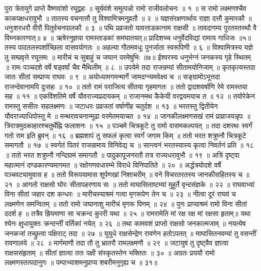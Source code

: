 पुरा त्रेतायुगे प्राप्ते वैष्णवांशो रघूद्वहः ॥
सूर्यवंशे समुत्पन्नो रामो राजीवलोचनः ॥ १ ॥
स रामो लक्ष्मणश्चैव काकपक्षधरावुभौ ॥
तातस्य वचनात्तौ तु विश्वामित्रमनुव्रतौ ॥ २ ॥
यज्ञसंरक्षणार्थाय राज्ञा दत्तौ कुमारकौ ॥
धनुःशरधरौ वीरौ पितुर्वचनपालकौ ॥ ३ ॥
पथि प्रव्रजतो यावत्ताडकानाम राक्षसी ॥
तावदागम्य पुरतस्तस्थौ वै विघ्नकारणात्॥ ४ ॥
ऋषेरनुज्ञया रामस्ताडकां समघातयत्॥
प्रादिशच्च धनुर्वेदविद्यां रामाय गाधिजः ॥५॥
तस्य पादतलस्पर्शाच्छिला वासवयोगतः ॥
अहल्या गौतमवधूः पुनर्जाता स्वरूपिणी ॥ ६ ॥
विश्वामित्रस्य यज्ञे तु सम्प्रवृत्ते रघूत्तमः ॥
मारीचं च सुबाहुं च जघान परमेषुभिः ॥७॥
ईश्वरस्य धनुर्भग्नं जनकस्य गृहे स्थितम् ॥
रामः पञ्चदशे वर्षे षड्वर्षां चैव मैथिलीम् ॥ ८ ॥
उपयेमे तदा राजन्रम्यां सीतामयोनिजाम् ॥
कृतकृत्यस्तदा जातः सीतां सम्प्राप्य राघवः ॥ ९ ॥
अयोध्यामगमन्मार्गे जामदग्न्यमवेक्ष्य च ॥
सङ्ग्रामोऽभूत्तदा राजन्देवानामपि दुःसहः ॥ १० ॥
ततो रामं पराजित्य सीतया गृहमागतः ॥
ततो द्वादशवर्षाणि रेमे रामस्तया सह ॥ ११ ॥
एकविंशतिमे वर्षे यौवराज्यप्रदायकम् ॥
राजानमथ कैकेयी वरद्वयमयाच त ॥ १२ ॥
तयोरेकेन रामस्तु ससीतः सहलक्ष्मणः ॥
जटाधरः प्रव्रजतां वर्षाणीह चतुर्दश ॥ १३ ॥
भरतस्तु द्वितीयेन यौवराज्याधिपोस्तु मे ॥
मन्थरावचनान्मूढा वरमेतमयाचत ॥ १४ ॥
जानकीलक्ष्मणसखं रामं प्राव्राजयन्नृपः ॥
त्रिरात्रमुदकाहारश्चतुर्थेह्नि फलाशनः ॥ १५ ॥
पञ्चमे चित्रकूटे तु रामो वासमकल्पयत् ॥
तदा दशरथः स्वर्गं गतो राम इति ब्रुवन् ॥ १६ ॥
ब्रह्मशापं तु सफलं कृत्वा स्वर्गं जगाम किम् ॥
ततो भरत शत्रुघ्नौ चित्रकूटे समागतौ ॥ १७ ॥
स्वर्गतं पितरं राजन्रामाय विनिवेद्य च ॥
सान्त्वनं भरतस्यास्य कृत्वा निवर्तनं प्रति ॥ १८ ॥
ततो भरत शत्रुघ्नौ नन्दिग्रामं समागतौ ॥
पादुकापूजनरतौ तत्र राज्यधरावुभौ ॥ १९ ॥
अत्रिं दृष्ट्वा महात्मानं दण्डकारण्यमागमत ॥
रक्षोगणवधारम्भे विराधे विनिपातिते ॥ २० ॥
अर्द्धत्रयोदशे वर्षे पञ्चवट्यामुवास ह ॥
ततो विरूपयामास शूर्पणखां निशाचरीम् ॥
वने विचरतरतस्य जानकीसहितस्य च ॥ २१ ॥
आगतो राक्षसो घोरः सीतापहरणाय सः ॥
ततो माघासिताष्टम्यां मुहूर्ते वृन्दसंज्ञके ॥ २२ ॥
राघवाभ्यां विना सीतां जहार दश कन्धरः ॥
मारीचस्याश्रमं गत्वा मृगरूपेण तेन च ॥ २३ ॥
नीत्वा दूरं राघवं च लक्ष्मणेन समन्वितम् ॥
ततो रामो जघानाशु मारीचं मृगरू पिणम् ॥ २४ ॥
पुनः प्राप्याश्रमं रामो विना सीतां ददर्श ह ॥
तत्रैव ह्रियमाणा सा चक्रन्द कुररी यथा ॥ २५ ॥
रामरामेति मां रक्ष रक्ष मां रक्षसा हृताम्॥
यथा श्येनः क्षुधायु्क्तः क्रन्दन्तीं वर्तिकां नयेत् ॥ २६ ॥
तथा कामवशं प्राप्तो राक्षसो जनकात्मजाम् ॥
नयत्येष जनकजां तच्छ्रुत्वा पक्षिराट् तदा ॥ २७ ॥
युयुधे राक्षसेन्द्रेण रावणेन हतोऽपतत् ॥
माघासितनवम्यां तु वसन्तीं रावणालये ॥ २८ ॥
मार्गमाणौ तदा तौ तु भ्रातरौ रामलक्ष्मणौ ॥ २९ ॥
जटायुषं तु दृष्ट्वैव ज्ञात्वा राक्षससंहृताम् ॥
सीतां ज्ञात्वा ततः पक्षी संस्कृतस्तेन भक्तितः ॥ ३० ॥
अग्रतः प्रययौ रामो लक्ष्मणस्तत्पदानुगः ॥
पम्पाभ्याशमनुप्राप्य शबरीमनुगृह्य च ॥ ३१॥
